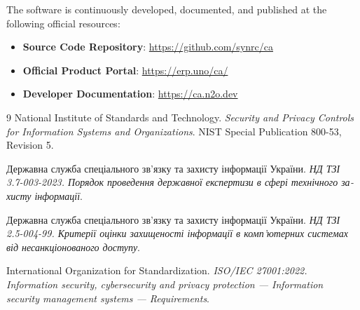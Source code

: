 \documentclass{article}
\begin{document}
The software is continuously developed, documented, and published at the following official resources:
\begin{itemize}
    \item \textbf{Source Code Repository}: \url{https://github.com/synrc/ca}
    \item \textbf{Official Product Portal}: \url{https://erp.uno/ca/}
    \item \textbf{Developer Documentation}: \url{https://ca.n2o.dev}
\end{itemize}

\begin{thebibliography}{9}
National Institute of Standards and Technology. \textit{Security and Privacy Controls for Information Systems and Organizations}. NIST Special Publication 800-53, Revision 5.

\foreignlanguage{ukrainian}{{Державна служба спеціального зв'язку та захисту інформації} України. \textit{\foreignlanguage{ukrainian}{\foreignlanguage{ukrainian}{НД \foreignlanguage{ukrainian}{ТЗІ}} 3.7-003-2023}. Порядок проведення державної експертизи в сфері технічного захисту інформації}.}

\foreignlanguage{ukrainian}{{Державна служба спеціального зв'язку та захисту інформації} України. \textit{\foreignlanguage{ukrainian}{\foreignlanguage{ukrainian}{НД \foreignlanguage{ukrainian}{ТЗІ}} 2.5-004-99}. Критерії оцінки захищеності інформації в комп'ютерних системах від несанкціонованого доступу}.}

International Organization for Standardization. \textit{ISO/IEC 27001:2022. Information security, cybersecurity and privacy protection — Information security management systems — Requirements}.
\end{thebibliography}
\end{document}
